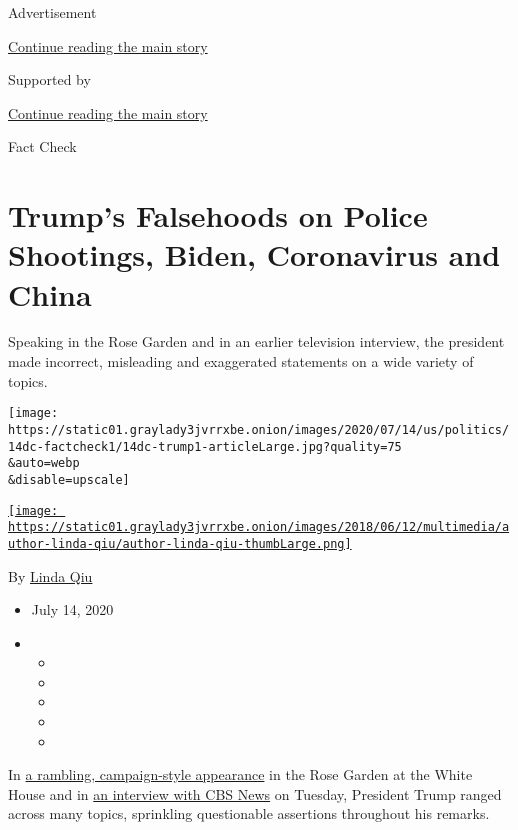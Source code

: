 Advertisement

\protect\hyperlink{after-top}{Continue reading the main story}

Supported by

\protect\hyperlink{after-sponsor}{Continue reading the main story}

Fact Check

\hypertarget{trumps-falsehoods-on-police-shootings-biden-coronavirus-and-china}{%
\section{Trump's Falsehoods on Police Shootings, Biden, Coronavirus and
China}\label{trumps-falsehoods-on-police-shootings-biden-coronavirus-and-china}}

Speaking in the Rose Garden and in an earlier television interview, the
president made incorrect, misleading and exaggerated statements on a
wide variety of topics.

\texttt{[image: https://static01.graylady3jvrrxbe.onion/images/2020/07/14/us/politics/14dc-factcheck1/14dc-trump1-articleLarge.jpg?quality=75\\\&auto=webp\\\&disable=upscale]}

\href{https://www.nytimes3xbfgragh.onion/by/linda-qiu}{\texttt{[image: https://static01.graylady3jvrrxbe.onion/images/2018/06/12/multimedia/author-linda-qiu/author-linda-qiu-thumbLarge.png]}}

By \href{https://www.nytimes3xbfgragh.onion/by/linda-qiu}{Linda Qiu}

\begin{itemize}
\item
  July 14, 2020
\item
  \begin{itemize}
  \item
  \item
  \item
  \item
  \item
  \end{itemize}
\end{itemize}

In
\href{https://www.nytimes3xbfgragh.onion/2020/07/14/us/politics/trump-news-conference.html}{a
rambling, campaign-style appearance} in the Rose Garden at the White
House and in
\href{https://www.cbsnews.com/news/trump-black-americans-killed-police-white-too/}{an
interview with CBS News} on Tuesday, President Trump ranged across many
topics, sprinkling questionable assertions throughout his remarks.

